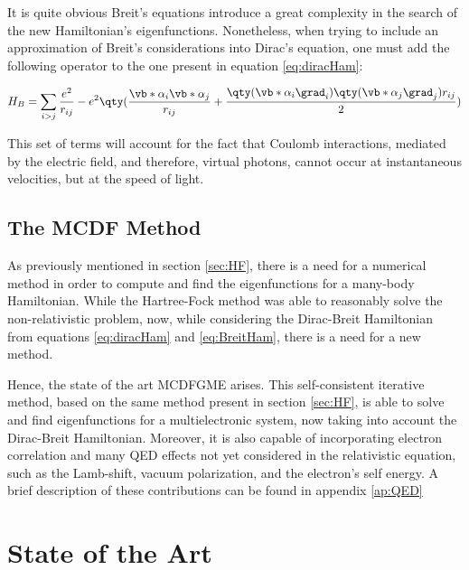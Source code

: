   It is quite obvious Breit's equations introduce a great complexity in the search of the new Hamiltonian's eigenfunctions. Nonetheless, when trying to include an approximation of Breit's considerations into Dirac's equation, one must add the following operator to the one present in equation \eqref{eq:diracHam}:

  \begin{equation}
    H_B = \sum_{i>j}\frac{e^2}{r_{ij}} - e^2\qty(\frac{\vb*{\alpha}_i\vb*{\alpha}_j}{r_{ij}}+\frac{\qty(\vb*{\alpha}_i \grad_i)\qty(\vb*{\alpha}_j \grad_j)r_{ij}}{2})  
    \label{eq:BreitHam}
  \end{equation}

This set of terms will account for the fact that Coulomb interactions, mediated by the electric field, and therefore, \gls{virtual photons}, cannot occur at instantaneous velocities, but at the speed of light.

\subsection{The \gls{MCDF} Method}

As previously mentioned in section \ref{sec:HF}, there is a need for a numerical method in order to compute and find the eigenfunctions for a many-body Hamiltonian. While the Hartree-Fock method was able to reasonably solve the non-relativistic problem, now, while considering the Dirac-Breit Hamiltonian from equations \eqref{eq:diracHam} and \eqref{eq:BreitHam}, there is a need for a new method.

Hence, the state of the art \gls{MCDFGME} arises. This self-consistent iterative method, based on the same method present in section \ref{sec:HF}, is able to solve and find eigenfunctions for a multielectronic system, now taking into account the Dirac-Breit Hamiltonian. Moreover, it is also capable of incorporating electron correlation and many QED effects not yet considered in the relativistic equation, such as the Lamb-shift, vacuum polarization, and the electron's self energy.
A brief description of these contributions can be found in  appendix \ref{ap:QED}




\section{State of the Art}


